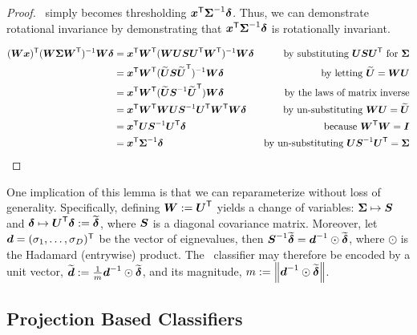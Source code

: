 \documentclass[10pt]{article}
\begin{document}
\begin{proof}
\Lda~simply becomes thresholding $\boldsymbol{x}^{\mathsf{T}} \boldsymbol{\Sigma}^{-1} \boldsymbol{\delta}$.  Thus, we can demonstrate rotational invariance by demonstrating that $\boldsymbol{x}^{\mathsf{T}} \boldsymbol{\Sigma}^{-1} \boldsymbol{\delta}$ is rotationally invariant. 


\begin{align*}
(\bW \bx) \T  (\bW \bSig \bW\T )^{-1} \bW \bdel  %
&= \bx\T \bW\T  (\bW \bU \bS \bU\T \bW\T)^{-1} \bW \bdel & \text{by substituting $\bU \bS \bU\T$ for $\bSig$} \\
&= \bx\T \bW\T  (\mt{\bU} \bS \mt{\bU}\T)^{-1} \bW \bdel & \text{by letting $\mt{\bU}=\bW \bU$} \\
&= \bx\T \bW\T  (\mt{\bU} \bS^{-1} \mt{\bU}\T) \bW \bdel & \text{by the laws of matrix inverse} \\
&= \bx\T \bW\T  \bW \bU \bS^{-1}  \bU\T \bW\T \bW \bdel & \text{by un-substituting $\bW \bU=\mt{\bU}$} \\
&= \bx\T  \bU \bS^{-1}  \bU\T  \bdel  & \text{because $\bW\T \bW = \bI$} \\
&= \bx\T   \bSig^{-1} \bdel & \text{by un-substituting $\bU \bS^{-1} \bU\T = \bSig$}
\end{align*}
\end{proof}

One implication of this lemma is that we can reparameterize without loss of generality.  Specifically, defining $\boldsymbol{W} := \boldsymbol{U}^{\mathsf{T}}$ yields a change of variables: $\boldsymbol{\Sigma} \mapsto \boldsymbol{S}$ and $\boldsymbol{\delta} \mapsto \boldsymbol{U}^{\mathsf{T}} \boldsymbol{\delta} := \widetilde{\boldsymbol{\delta}}$, where $\boldsymbol{S}$ is a diagonal covariance matrix.  Moreover, let $\boldsymbol{d}=(\sigma_1,\ldots, \sigma_D)^{\mathsf{T}}$ be the vector of eignevalues, then $\boldsymbol{S}^{-1} \widetilde{\boldsymbol{\delta}}=\boldsymbol{d}^{-1} \odot \widetilde{\boldsymbol{\delta}}$, where $\odot$ is the Hadamard (entrywise) product.  The \Lda~classifier may therefore be encoded by a unit vector, $\widetilde{\boldsymbol{d}}:= \frac{1}{m} \boldsymbol{d}^{-1} \odot \widetilde{\boldsymbol{\delta}}$, and its magnitude, $m:=\left \lVert\boldsymbol{d}^{-1} \odot \widetilde{\boldsymbol{\delta}} \right \rVert$.


\subsection{Projection Based Classifiers}
\end{document}
